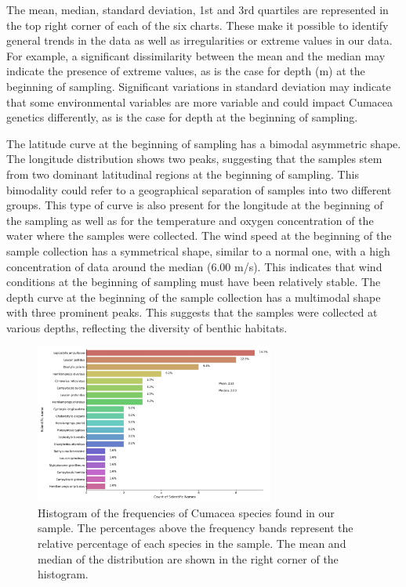 The mean, median, standard deviation, 1st and 3rd quartiles are represented in the top right corner of each of the six charts. These make it possible to identify general trends in the data as well as irregularities or extreme values in our data. For example, a significant dissimilarity between the mean and the median may indicate the presence of extreme values, as is the case for depth (m) at the beginning of sampling. Significant variations in standard deviation may indicate that some environmental variables are more variable and could impact Cumacea genetics differently, as is the case for depth at the beginning of sampling. 

The latitude curve at the beginning of sampling has a bimodal asymmetric shape. The longitude distribution shows two peaks, suggesting that the samples stem from two dominant latitudinal regions at the beginning of sampling. This bimodality could refer to a geographical separation of samples into two different groups. This type of curve is also present for the longitude at the beginning of the sampling as well as for the temperature and oxygen concentration of the water where the samples were collected. The wind speed at the beginning of the sample collection has a symmetrical shape, similar to a normal one, with a high concentration of data around the median (6.00 m/s). This indicates that wind conditions at the beginning of sampling must have been relatively stable. The depth curve at the beginning of the sample collection has a multimodal shape with three prominent peaks. This suggests that the samples were collected at various depths, reflecting the diversity of benthic habitats.

\begin{figure}[]
    \centering
    \includegraphics[width=0.7\textwidth]{figure2.jpg}
    \caption{Histogram of the frequencies of Cumacea species found in our sample. The percentages above the frequency bands represent the relative percentage of each species in the sample. The mean and median of the distribution are shown in the right corner of the histogram. \label{fig:fig2}}
\end{figure}


